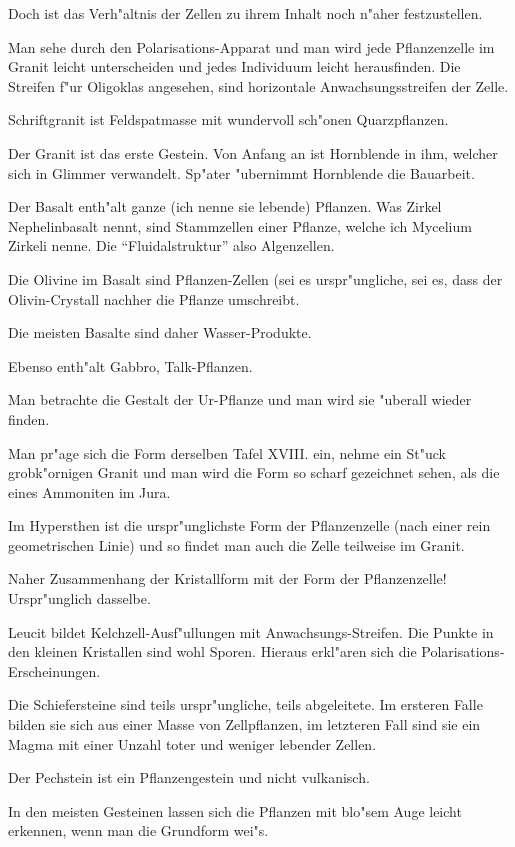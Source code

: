 \documentclass[a4paper, 11pt, oneside, german]{article}
\begin{document}
Doch ist das Verh"altnis der Zellen zu ihrem Inhalt noch n"aher festzustellen.

Man sehe durch den Polarisations-Apparat und man wird jede Pflanzenzelle im Granit leicht unterscheiden und jedes Individuum leicht herausfinden. Die Streifen f"ur Oligoklas angesehen, sind horizontale Anwachsungsstreifen der Zelle.

Schriftgranit ist Feldspatmasse mit wundervoll sch"onen Quarzpflanzen.

Der Granit ist das erste Gestein. Von Anfang an ist Hornblende in ihm, welcher sich in Glimmer verwandelt. Sp"ater "ubernimmt Hornblende die Bauarbeit.

Der Basalt enth"alt ganze (ich nenne sie lebende) Pflanzen. Was Zirkel Nephelinbasalt nennt, sind Stammzellen einer Pflanze, welche ich Mycelium Zirkeli nenne. Die "`Fluidalstruktur"' also Algenzellen.

Die Olivine im Basalt sind Pflanzen-Zellen (sei es urspr"ungliche, sei es, dass der Olivin-Crystall nachher die Pflanze umschreibt.

Die meisten Basalte sind daher Wasser-Produkte.

Ebenso enth"alt Gabbro, Talk-Pflanzen.

Man betrachte die Gestalt der Ur-Pflanze und man wird sie "uberall wieder finden.

Man pr"age sich die Form derselben Tafel XVIII. ein, nehme ein St"uck grobk"ornigen Granit und man wird die Form so scharf gezeichnet sehen, als die eines Ammoniten im Jura.

Im Hypersthen ist die urspr"unglichste Form der Pflanzenzelle (nach einer rein geometrischen Linie) und so findet man auch die Zelle teilweise im Granit.

Naher Zusammenhang der Kristallform mit der Form der Pflanzenzelle! Urspr"unglich dasselbe.

Leucit bildet Kelchzell-Ausf"ullungen mit Anwachsungs-Streifen. Die Punkte in den kleinen Kristallen sind wohl Sporen. Hieraus erkl"aren sich die Polarisations-Erscheinungen.

Die Schiefersteine sind teils urspr"ungliche, teils abgeleitete. Im ersteren Falle bilden sie sich aus einer Masse von Zellpflanzen, im letzteren Fall sind sie ein Magma mit einer Unzahl toter und weniger lebender Zellen.

Der Pechstein ist ein Pflanzengestein und nicht vulkanisch.

In den meisten Gesteinen lassen sich die Pflanzen mit blo"sem Auge leicht erkennen, wenn man die Grundform wei"s.
\end{document}
